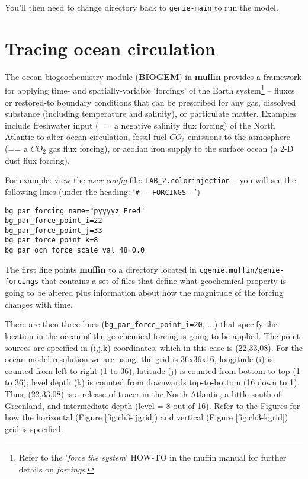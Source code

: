 \documentclass[11pt,fleqn]{book} %
\begin{document}
You’ll then need to change directory back to \texttt{genie-main} to run the model.


\newpage


\section{Tracing ocean circulation}

The ocean biogeochemistry module (\textbf{BIOGEM}) in \textbf{muffin} provides a framework for applying time- and spatially-variable ‘forcings’ of the Earth system\footnote{Refer to the '\textit{force the system}' \textsf{HOW-TO} in the muffin manual for further details on \textit{forcings}.} – fluxes or restored-to boundary conditions that can be prescribed for any gas, dissolved substance (including temperature and salinity), or particulate matter. Examples include freshwater input (== a negative salinity flux forcing) of the North Atlantic to alter ocean circulation, fossil fuel \(CO_{2}\) emissions to the atmosphere (== a \(CO_{2}\) gas flux forcing), or aeolian iron supply to the surface ocean (a 2-D dust flux forcing).

For example: view the \textit{user-config} file: \texttt{LAB\_2.colorinjection} – you will see the following lines (under the heading: ‘\texttt{\# --- FORCINGS ---}’)

\vspace{-2mm}
\begin{verbatim}
bg_par_forcing_name="pyyyyz_Fred"
bg_par_force_point_i=22
bg_par_force_point_j=33
bg_par_force_point_k=8
bg_par_ocn_force_scale_val_48=0.0
\end{verbatim}
\vspace{-2mm}

The first line points \textbf{muffin} to a directory located in \texttt{cgenie.muffin/genie-forcings} that contains a set of files that define what geochemical property is going to be altered plus information about how the magnitude of the forcing changes with time.

There are then three lines (\texttt{bg\_par\_force\_point\_i=20}, ...) that specify the location in the ocean of the geochemical forcing is going to be applied. The point sources are specified in (i,j,k) coordinates, which in this case is (22,33,08). For the ocean model resolution we are using, the grid is 36x36x16, longitude (i) is counted from left-to-right (1 to 36); latitude (j) is counted from bottom-to-top (1 to 36); level depth (k) is counted from downwards top-to-bottom (16 down to 1). Thus, (22,33,08) is a release of tracer in the North Atlantic, a little south of Greenland, and intermediate depth (level = 8 out of 16). Refer to the Figures for how the horizontal (Figure \ref{fig:ch3-ijgrid}) and vertical (Figure \ref{fig:ch3-kgrid}) grid is specified.
\end{document}
